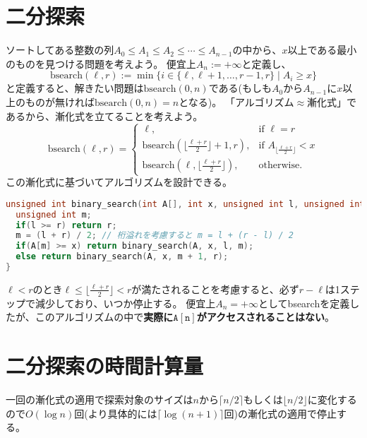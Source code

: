\documentclass[a4paper,twoside,onecolumn,openany,article,10pt]{memoir}
\theoremstyle{remark}
\begin{document}
\section{二分探索}
ソートしてある整数の列$A_0\le A_1\le A_2\le \dotsb\le A_{n-1}$の中から、$x$以上である最小のものを見つける問題を考えよう。
便宜上$A_n := +\infty$と定義し、
\begin{equation*}
\mathrm{bsearch}(\ell, r) := \min\bigl\{i\in\{\ell,\ell+1,\dotsc,r-1,r\}\mid A_i\ge x\bigr\}
\end{equation*}
と定義すると、解きたい問題は$\mathrm{bsearch}(0,n)$である(もしも$A_0$から$A_{n-1}$に$x$以上のものが無ければ$\mathrm{bsearch}(0,n)=n$となる)。
「アルゴリズム$\approx$漸化式」であるから、漸化式を立てることを考えよう。
\begin{equation*}
\mathrm{bsearch}(\ell, r) =
\begin{cases}
\ell,& \text{if } \ell = r\\
\mathrm{bsearch}(\lfloor \frac{\ell + r}2\rfloor+1, r),& \text{if } A_{\lfloor\frac{\ell + r}2\rfloor} < x\\
\mathrm{bsearch}(\ell, \lfloor \frac{\ell + r}2\rfloor),& \text{otherwise.}
\end{cases}
\end{equation*}
この漸化式に基づいてアルゴリズムを設計できる。

\begin{lstlisting}[basicstyle=\ttfamily\normalsize,showstringspaces=false,language=C,frame=single]
unsigned int binary_search(int A[], int x, unsigned int l, unsigned int r){
  unsigned int m;
  if(l >= r) return r;
  m = (l + r) / 2; // 桁溢れを考慮すると m = l + (r - l) / 2
  if(A[m] >= x) return binary_search(A, x, l, m);
  else return binary_search(A, x, m + 1, r);
}
\end{lstlisting}
$\ell<r$のとき$\ell \le \lfloor \frac{\ell+r}2\rfloor < r$が満たされることを考慮すると、必ず$r-\ell$は1ステップで減少しており、いつか停止する。
便宜上$A_n=+\infty$として\textrm{bsearch}を定義したが、このアルゴリズムの中で\textbf{実際に$\mathtt{A[n]}$がアクセスされることはない}。

\section{二分探索の時間計算量}
一回の漸化式の適用で探索対象のサイズは$n$から$\lceil n/2\rceil$もしくは$\lfloor n/2\rfloor$に変化するので$O(\log n)$回(より具体的には$\lceil\log (n+1)\rceil$回)の漸化式の適用で停止する。
\end{document}

